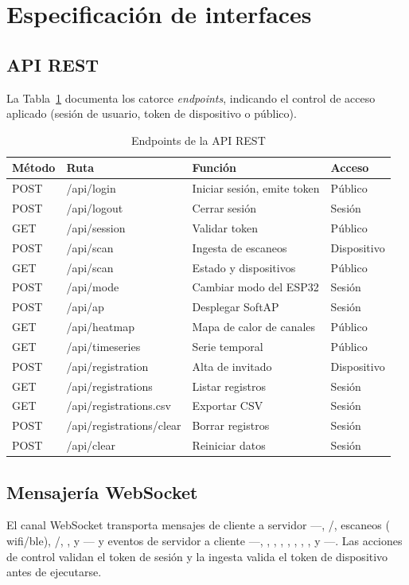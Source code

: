 \section{Especificación de interfaces}
\subsection{API REST}
La Tabla~\ref{tab:rest} documenta los catorce \emph{endpoints}, indicando el control de acceso aplicado (sesión de usuario, token de dispositivo o público).

\begin{table}[H]
\centering
\caption{Endpoints de la API REST}
\label{tab:rest}
\footnotesize
\begin{tabularx}{\linewidth}{@{}l l X l@{}}
\toprule
\textbf{Método} & \textbf{Ruta} & \textbf{Función} & \textbf{Acceso} \\
\midrule
POST & /api/login & Iniciar sesión, emite token & Público \\
POST & /api/logout & Cerrar sesión & Sesión \\
GET  & /api/session & Validar token & Público \\
POST & /api/scan & Ingesta de escaneos & Dispositivo \\
GET  & /api/scan & Estado y dispositivos & Público \\
POST & /api/mode & Cambiar modo del ESP32 & Sesión \\
POST & /api/ap & Desplegar SoftAP & Sesión \\
GET  & /api/heatmap & Mapa de calor de canales & Público \\
GET  & /api/timeseries & Serie temporal & Público \\
POST & /api/registration & Alta de invitado & Dispositivo \\
GET  & /api/registrations & Listar registros & Sesión \\
GET  & /api/registrations.csv & Exportar CSV & Sesión \\
POST & /api/registrations/clear & Borrar registros & Sesión \\
POST & /api/clear & Reiniciar datos & Sesión \\
\bottomrule
\end{tabularx}
\end{table}

\subsection{Mensajería WebSocket}
El canal WebSocket transporta mensajes de cliente a servidor ---, /, escaneos ( wifi/ble), /, ,  y --- y eventos de servidor a cliente ---, , , , , , , ,  y ---. Las acciones de control validan el token de sesión y la ingesta valida el token de dispositivo antes de ejecutarse.
